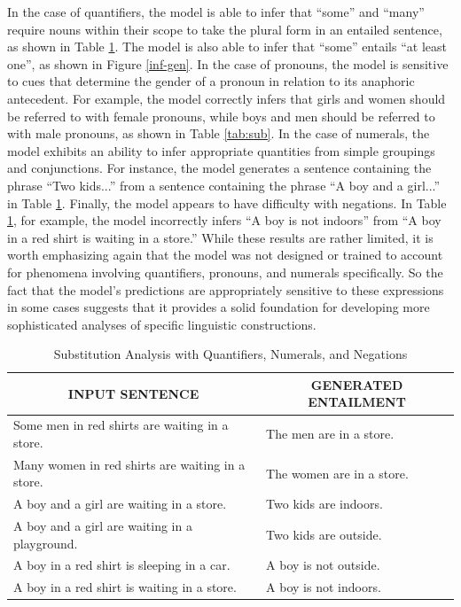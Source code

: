 In the case of quantifiers, the model is able to infer that ``some'' and ``many'' require nouns within their scope to take the plural form in an entailed sentence, as shown in Table \ref{tab:quantifiers}. The model is also able to infer that ``some'' entails ``at least one'', as shown in Figure \ref{inf-gen}. In the case of pronouns, the model is sensitive to cues that determine the gender of a pronoun in relation to its anaphoric antecedent. For example, the model correctly infers that girls and women should be referred to with female pronouns, while boys and men should be referred to with male pronouns, as shown in Table \ref{tab:sub}. In the case of numerals, the model exhibits an ability to infer appropriate quantities from simple groupings and conjunctions. For instance, the model generates a sentence containing the phrase ``Two kids...'' from a sentence containing the phrase ``A boy and a girl...'' in Table \ref{tab:quantifiers}. Finally, the model appears to have difficulty with negations. In Table \ref{tab:quantifiers}, for example, the model incorrectly infers ``A boy is not indoors'' from ``A boy in a red shirt is waiting in a store.'' While these results are rather limited, it is worth emphasizing again that the model was not designed or trained to account for phenomena involving quantifiers, pronouns, and numerals specifically. So the fact that the model's predictions are appropriately sensitive to these expressions in some cases suggests that it provides a solid foundation for developing more sophisticated analyses of specific linguistic constructions. 

\begin{table}[!t]
\begin{center} 
\caption{Substitution Analysis with Quantifiers, Numerals, and Negations} 
\label{tab:quantifiers} 
\vskip 0.06in

\setlength{\tabcolsep}{13pt}
\begin{tabular}{ll} 
\hline

\multicolumn{1}{c}{\rule{0pt}{3ex} INPUT SENTENCE} & 
\multicolumn{1}{c}{GENERATED ENTAILMENT} \\

\hline
\rule{0pt}{3ex} Some men in red shirts are waiting in a store. & \quad The men are in a store. \\
Many women in red shirts are waiting in a store. & \quad The women are in a store. \\
A boy and a girl are waiting in a store. & \quad Two kids are indoors. \\
A boy and a girl are waiting in a playground. & \quad Two kids are outside. \\
A boy in a red shirt is sleeping in a car. & \quad A boy is not outside. \\
A boy in a red shirt is waiting in a store. & \quad A boy is not indoors. \\
\hline
\end{tabular}

\end{center} 
\end{table}

